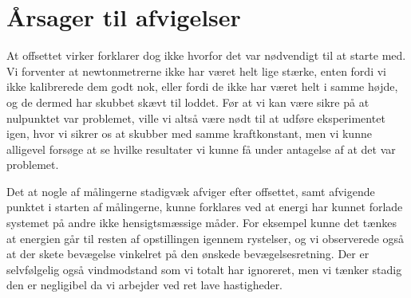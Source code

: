 \section{Årsager til afvigelser}
At offsettet virker forklarer dog ikke hvorfor det var nødvendigt til at starte med. Vi forventer at newtonmetrerne ikke har været helt lige stærke, 
enten fordi vi ikke kalibrerede dem godt nok, eller fordi de ikke har været helt i samme højde, og de dermed har skubbet skævt til loddet.
Før at vi kan være sikre på at nulpunktet var problemet, ville vi altså være nødt til at udføre eksperimentet igen, hvor vi sikrer os at skubber med samme kraftkonstant, 
men vi kunne alligevel forsøge at se hvilke resultater vi kunne få under antagelse af at det var problemet. 

Det at nogle af målingerne stadigvæk afviger efter offsettet, samt afvigende punktet i starten af målingerne, kunne forklares ved at energi har kunnet forlade systemet på andre ikke hensigtsmæssige måder. 
For eksempel kunne det tænkes at energien går til resten af opstillingen igennem rystelser, og vi observerede også at der skete bevægelse vinkelret på den ønskede bevægelsesretning.
Der er selvfølgelig også vindmodstand som vi totalt har ignoreret, men vi tænker stadig den er negligibel da vi arbejder ved ret lave hastigheder.

